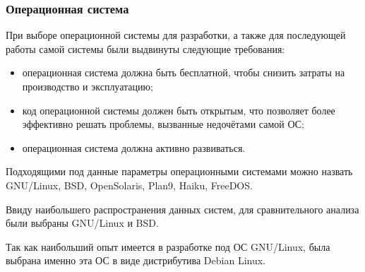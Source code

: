 \subsubsection{Операционная система}

При выборе операционной системы для разработки, а также для последующей работы самой системы были выдвинуты следующие требования:
\begin{itemize}
\item операционная система должна быть бесплатной, чтобы снизить затраты на производство и эксплуатацию;
\item код операционной системы должен быть открытым, что позволяет более эффективно решать проблемы, вызванные недочётами самой ОС;
\item операционная система должна активно развиваться.
\end{itemize}

Подходящими под данные параметры операционными системами можно назвать GNU/Linux, BSD, OpenSolaris, Plan9, Haiku, FreeDOS.

Ввиду наибольшего распространения данных систем, для сравнительного анализа были выбраны GNU/Linux и BSD.


Так как наибольший опыт имеется в разработке под ОС GNU/Linux, была выбрана именно эта ОС в виде дистрибутива Debian Linux.

